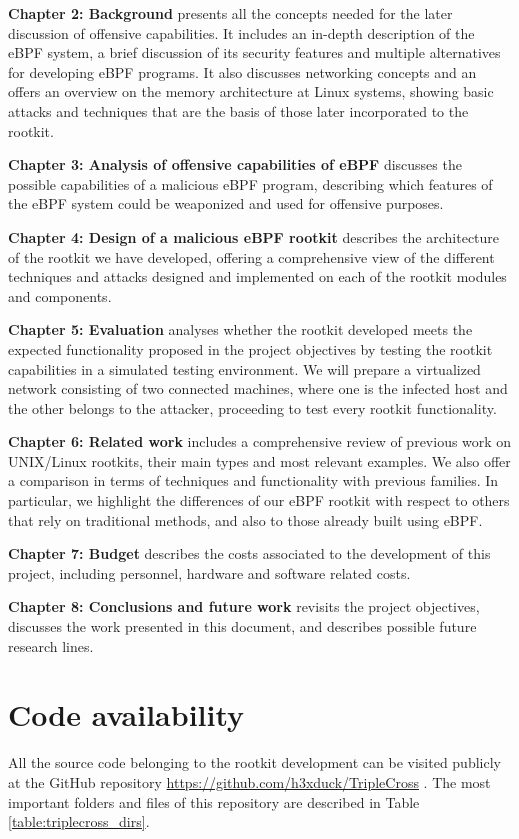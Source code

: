 \textbf{Chapter 2: Background} presents all the concepts needed for the later discussion of offensive capabilities. It includes an in-depth description of the eBPF system, a brief discussion of its security features and multiple alternatives for developing eBPF programs. It also discusses networking concepts and an offers an overview on the memory architecture at Linux systems, showing basic attacks and techniques that are the basis of those later incorporated to the rootkit.

\textbf{Chapter 3: Analysis of offensive capabilities of eBPF} discusses the possible capabilities of a malicious eBPF program, describing which features of the eBPF system could be weaponized and used for offensive purposes.

\textbf{Chapter 4: Design of a malicious eBPF rootkit} describes the architecture of the rootkit we have developed, offering a comprehensive view of the different techniques and attacks designed and implemented on each of the rootkit modules and components.

\textbf{Chapter 5: Evaluation} analyses whether the rootkit developed meets the expected functionality proposed in the project objectives by testing the rootkit capabilities in a simulated testing environment. We will prepare a virtualized network consisting of two connected machines, where one is the infected host and the other belongs to the attacker, proceeding to test every rootkit functionality.

\textbf{Chapter 6: Related work} includes a comprehensive review of previous work on UNIX/Linux rootkits, their main types and most relevant examples. We also offer a comparison in terms of techniques and functionality with previous families. In particular, we highlight the differences of our eBPF rootkit with respect to others that rely on traditional methods, and also to those already built using eBPF.

\textbf{Chapter 7: Budget} describes the costs associated to the development of this project, including personnel, hardware and software related costs.

\textbf{Chapter 8: Conclusions and future work} revisits the project objectives, discusses the work presented in this document, and describes possible future research lines.

\section{Code availability}
All the source code belonging to the rootkit development can be visited publicly at the GitHub repository \url{https://github.com/h3xduck/TripleCross} \cite{triplecross_github}. The most important folders and files of this repository are described in Table \ref{table:triplecross_dirs}.

